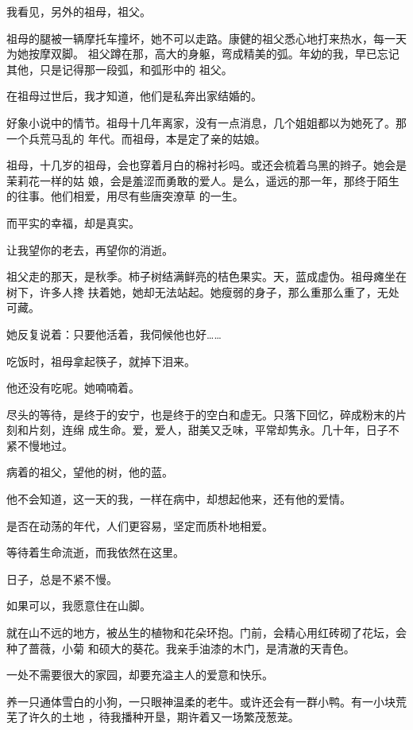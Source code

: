 \documentclass[12pt,a4paper]{article}
\begin{document}
		我看见，另外的祖母，祖父。

		祖母的腿被一辆摩托车撞坏，她不可以走路。康健的祖父悉心地打来热水，每一天为她按摩双脚。
	祖父蹲在那，高大的身躯，弯成精美的弧。年幼的我，早已忘记其他，只是记得那一段弧，和弧形中的
	祖父。

		在祖母过世后，我才知道，他们是私奔出家结婚的。

		好象小说中的情节。祖母十几年离家，没有一点消息，几个姐姐都以为她死了。那一个兵荒马乱的
	年代。而祖母，本是定了亲的姑娘。

		祖母，十几岁的祖母，会也穿着月白的棉衬衫吗。或还会梳着乌黑的辫子。她会是茉莉花一样的姑
	娘，会是羞涩而勇敢的爱人。是么，遥远的那一年，那终于陌生的往事。他们相爱，用尽有些唐突潦草
	的一生。

		而平实的幸福，却是真实。\par
		让我望你的老去，再望你的消逝。

		祖父走的那天，是秋季。柿子树结满鲜亮的桔色果实。天，蓝成虚伪。祖母瘫坐在树下，许多人搀
	扶着她，她却无法站起。她瘦弱的身子，那么重那么重了，无处可藏。

		她反复说着：只要他活着，我伺候他也好……\par
		吃饭时，祖母拿起筷子，就掉下泪来。\par
		他还没有吃呢。她喃喃着。

		尽头的等待，是终于的安宁，也是终于的空白和虚无。只落下回忆，碎成粉末的片刻和片刻，连绵
	成生命。爱，爱人，甜美又乏味，平常却隽永。几十年，日子不紧不慢地过。

		病着的祖父，望他的树，他的蓝。\par
		他不会知道，这一天的我，一样在病中，却想起他来，还有他的爱情。\par
		是否在动荡的年代，人们更容易，坚定而质朴地相爱。\par
		等待着生命流逝，而我依然在这里。\par
		日子，总是不紧不慢。

	\endwriting



		如果可以，我愿意住在山脚。

		就在山不远的地方，被丛生的植物和花朵环抱。门前，会精心用红砖砌了花坛，会种了蔷薇，小菊
	和硕大的葵花。我亲手油漆的木门，是清澈的天青色。

		一处不需要很大的家园，却要充溢主人的爱意和快乐。

		养一只通体雪白的小狗，一只眼神温柔的老牛。或许还会有一群小鸭。有一小块荒芜了许久的土地
	，待我播种开垦，期许着又一场繁茂葱茏。
\end{document}
